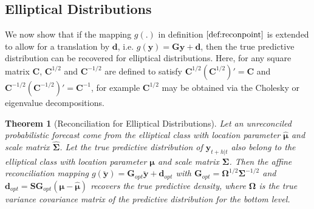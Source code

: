 \documentclass[a4paper, 11pt]{article}
\theoremstyle{theo}
\newtheorem{theo}{Theorem}[section]
\theoremstyle{definition}
\begin{document}
\subsection{Elliptical Distributions}
We now show that if the mapping $g(.)$ in definition $\ref{def:reconpoint}$ is extended to allow for a translation by ${\bm d}$, i.e. $g({\bm y})={\bm G}{\bm y}+{\bm d}$, then the true predictive distribution can be recovered for elliptical distributions.  Here, for any square matrix ${\bm C}$, ${\bm C}^{1/2}$ and ${\bm C}^{-1/2}$ are defined to satisfy ${\bm C}^{1/2}\left({\bm C}^{1/2}\right)'={\bm C}$ and ${\bm C}^{-1/2}\left({\bm C}^{-1/2}\right)'={\bm C}^{-1}$, for example ${\bm C}^{1/2}$ may be obtained via the Cholesky or eigenvalue decompositions. 
\begin{theo}[Reconciliation for Elliptical Distributions]
	Let an unreconciled probabilistic forecast come from the elliptical class with location parameter $\hat{\bm \mu}$ and scale matrix $\hat{\bm \Sigma}$.  Let the true predictive distribution of ${\bm y}_{t+h|t}$ also belong to the elliptical class with location parameter ${\bm \mu}$ and scale matrix ${\bm \Sigma}$.  Then the affine reconciliation mapping $g(\breve{\bm y})={\bm G}_{opt}\breve{\bm y}+{\bm d}_{opt}$ with $\bm{G}_{opt}={\bm\Omega}^{1/2}{\bm\Sigma}^{-1/2}$ and ${\bm d}_{opt}={\bm S}{\bm G}_{opt}\left({\bm \mu}-\hat{\bm \mu}\right)$ recovers the true predictive density, where $\bm\Omega$ is the true variance covariance matrix of the predictive distribution for the bottom level. 
\end{theo}
\end{document}

